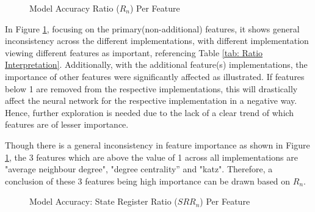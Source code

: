 \documentclass{tum-book}
\begin{document}
        \newpage\begin{figure}
            \centering
            
            \caption{Model Accuracy Ratio ($R_n$) Per Feature}
            \label{fig:Model Accuracy Ratio ($R_n$) Per Feature}
        \end{figure}
        
        \noindent
        In Figure \ref{fig:Model Accuracy Ratio ($R_n$) Per Feature}, focusing on the primary(non-additional) features, it shows general inconsistency across the different implementations, with different implementation viewing different features as important, referencing Table \ref{tab: Ratio Interpretation}. Additionally, with the additional feature(s) implementations, the importance of other features were significantly affected as illustrated. If features below 1 are removed from the respective implementations, this will drastically affect the neural network for the respective implementation in a negative way. Hence, further exploration is needed due to the lack of a clear trend of which features are of lesser importance.
        
        \bigskip\noindent
        Though there is a general inconsistency in feature importance as shown in Figure \ref{fig:Model Accuracy Ratio ($R_n$) Per Feature}, the 3 features which are above the value of 1 across all implementations are "average neighbour degree", "degree centrality” and "katz". Therefore, a conclusion of these 3 features being high importance can be drawn based on $R_n$.
        
        \newpage\begin{figure}
            \centering
            
            \caption{Model Accuracy: State Register Ratio ($SRR_n$) Per Feature}
            \label{fig:Model Accuracy: State Register Ratio ($SRR_n$) Per Feature}
        \end{figure}
 
\end{document}
